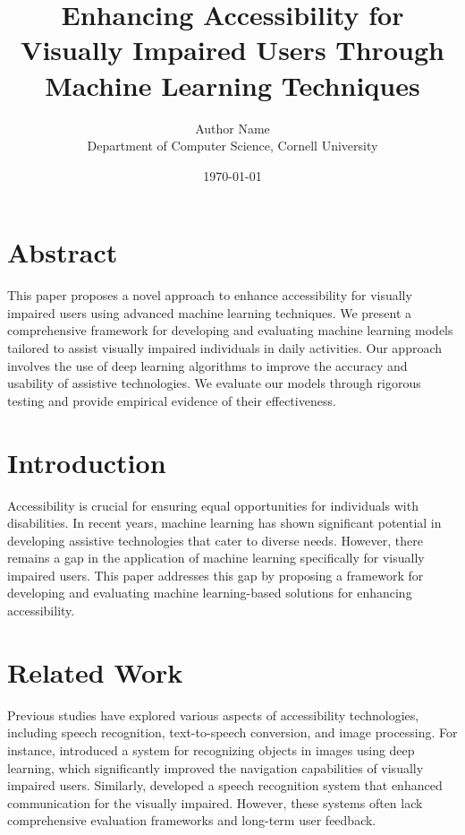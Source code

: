 \documentclass{article}
\title{Enhancing Accessibility for Visually Impaired Users Through Machine Learning Techniques}
\author{Author Name \\
Department of Computer Science, Cornell University}
\date{\today}
\begin{document}
\maketitle

\section{Abstract}
This paper proposes a novel approach to enhance accessibility for visually impaired users using advanced machine learning techniques. We present a comprehensive framework for developing and evaluating machine learning models tailored to assist visually impaired individuals in daily activities. Our approach involves the use of deep learning algorithms to improve the accuracy and usability of assistive technologies. We evaluate our models through rigorous testing and provide empirical evidence of their effectiveness.

\section{Introduction}
Accessibility is crucial for ensuring equal opportunities for individuals with disabilities. In recent years, machine learning has shown significant potential in developing assistive technologies that cater to diverse needs. However, there remains a gap in the application of machine learning specifically for visually impaired users. This paper addresses this gap by proposing a framework for developing and evaluating machine learning-based solutions for enhancing accessibility.

\section{Related Work}
Previous studies have explored various aspects of accessibility technologies, including speech recognition, text-to-speech conversion, and image processing. For instance, \cite{ref1} introduced a system for recognizing objects in images using deep learning, which significantly improved the navigation capabilities of visually impaired users. Similarly, \cite{ref2} developed a speech recognition system that enhanced communication for the visually impaired. However, these systems often lack comprehensive evaluation frameworks and long-term user feedback.
\end{document}
